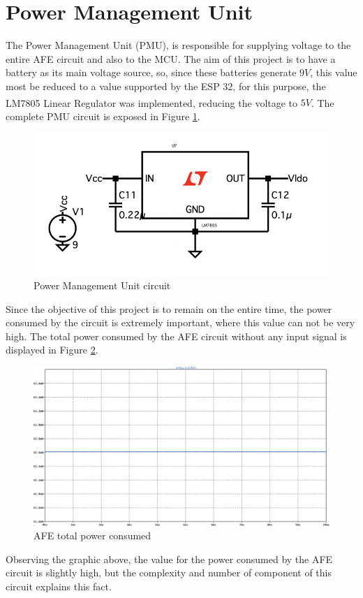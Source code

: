 \section{Power Management Unit}

The Power Management Unit (PMU), is responsible for supplying voltage to the entire AFE circuit and also to the MCU. The aim of this project is to have a battery as its main voltage source, so, since these batteries generate $9V$, this value most be reduced to a value supported by the ESP 32, for this purpose, the LM7805 Linear Regulator was implemented, reducing the voltage to $5V$\textsuperscript{\cite{lm7805-datasheet}}. The complete PMU circuit is exposed in Figure \ref{fig:PMU}.

\begin{figure}[H]
    \centering
    \includegraphics*[scale = 0.4]{Images/PMU.png}
    \caption{Power Management Unit circuit}
    \label{fig:PMU}
\end{figure}

Since the objective of this project is to remain on the entire time, the power consumed by the circuit is extremely important, where this value can not be very high. The total power consumed by the AFE circuit without any input signal is displayed in Figure \ref{fig:Power}.

\begin{figure}[H]
    \centering
    \includegraphics*[scale = 0.25]{Images/Power.png}
    \caption{AFE total power consumed}
    \label{fig:Power}
\end{figure}

Observing the graphic above, the value for the power consumed by the AFE circuit is slightly high, but the complexity and number of component of this circuit explains this fact. 